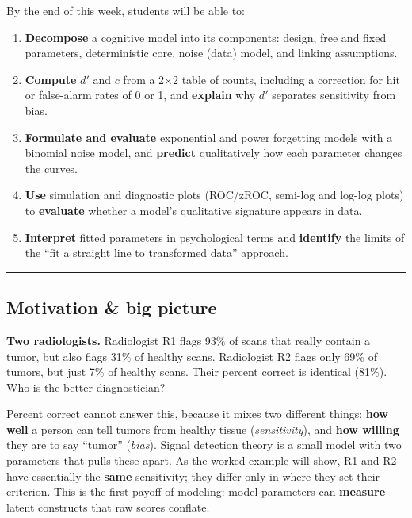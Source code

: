 By the end of this week, students will be able to:

\begin{enumerate}
\def\labelenumi{\arabic{enumi}.}
\tightlist
\item
  \textbf{Decompose} a cognitive model into its components: design, free
  and fixed parameters, deterministic core, noise (data) model, and
  linking assumptions.
\item
  \textbf{Compute} \(d'\) and \(c\) from a 2×2 table of counts,
  including a correction for hit or false-alarm rates of 0 or 1, and
  \textbf{explain} why \(d'\) separates sensitivity from bias.
\item
  \textbf{Formulate and evaluate} exponential and power forgetting models with a
  binomial noise model, and \textbf{predict} qualitatively how each
  parameter changes the curves.
\item
  \textbf{Use} simulation and diagnostic plots (ROC/zROC, semi-log and
  log-log plots) to \textbf{evaluate} whether a model's qualitative
  signature appears in data.
\item
  \textbf{Interpret} fitted parameters in psychological terms and
  \textbf{identify} the limits of the ``fit a straight line to
  transformed data'' approach.
\end{enumerate}

\begin{center}\rule{0.5\linewidth}{0.5pt}\end{center}

\subsection{Motivation \& big picture}

\textbf{Two radiologists.} Radiologist R1 flags 93\% of scans that
really contain a tumor, but also flags 31\% of healthy scans.
Radiologist R2 flags only 69\% of tumors, but just 7\% of healthy scans.
Their percent correct is identical (81\%). Who is the better
diagnostician?

Percent correct cannot answer this, because it mixes two different
things: \textbf{how well} a person can tell tumors from healthy tissue
(\emph{sensitivity}), and \textbf{how willing} they are to say ``tumor''
(\emph{bias}). Signal detection theory is a small model with two
parameters that pulls these apart. As the worked example will show, R1
and R2 have essentially the \textbf{same} sensitivity; they differ only
in where they set their criterion. This is the first payoff of modeling:
model parameters can \textbf{measure} latent constructs that raw scores
conflate.

